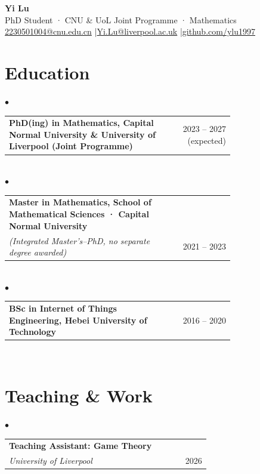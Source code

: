 \documentclass[11pt, a4paper]{article}
\begin{document}
\begin{center}
  {\LARGE\bfseries Yi Lu}\\[4pt]
  PhD Student · CNU \& UoL Joint Programme · Mathematics\\[2pt]
  \href{mailto:2230501004@cnu.edu.cn}{2230501004@cnu.edu.cn} \quad|\quad \href{mailto:Yi.Lu@liverpool.ac.uk}{Yi.Lu@liverpool.ac.uk} \quad|\quad \href{https://github.com/ylu1997}{github.com/ylu1997}
\end{center}

\section{Education}

\hspace{1em}$\bullet$\quad\begin{tabular}{@{}p{0.75\linewidth}r@{}}\textbf{PhD(ing) in Mathematics, Capital Normal University \& University of Liverpool (Joint Programme)} & 2023 – 2027 (expected)\\\end{tabular}\\

\hspace{1em}$\bullet$\quad\begin{tabular}{@{}p{0.75\linewidth}r@{}}\textbf{Master in Mathematics, School of Mathematical Sciences · Capital Normal University}\\
\textit{(Integrated Master's–PhD, no separate degree awarded)} & 2021 – 2023\\\end{tabular}\\

\hspace{1em}$\bullet$\quad\begin{tabular}{@{}p{0.75\linewidth}r@{}}\textbf{BSc in Internet of Things Engineering, Hebei University of Technology} & 2016 – 2020\\\end{tabular}\\

\section{Teaching \& Work}

\hspace{1em}$\bullet$\quad\begin{tabular}{@{}p{0.75\linewidth}r@{}}\textbf{Teaching Assistant: Game Theory}\\
\textit{University of Liverpool} & 2026\\\end{tabular}\\
\end{document}
